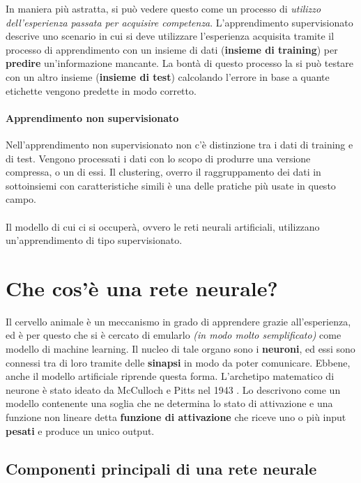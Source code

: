 \documentclass[12pt, twoside, letterpaper]{report}
\begin{document}
					In maniera più astratta, si può vedere questo come un processo di \textit{utilizzo dell'esperienza passata per acquisire competenza}. L'apprendimento supervisionato descrive uno scenario in cui si deve utilizzare l'esperienza acquisita tramite il processo di apprendimento con un insieme di dati (\textbf{insieme di training}) per \textbf{predire} un'informazione mancante. La bontà di questo processo la si può testare con un altro insieme (\textbf{insieme di test}) calcolando l'errore in base a quante etichette vengono predette in modo corretto. 
				
				\paragraph{Apprendimento non supervisionato}  Nell'apprendimento non supervisionato non c'è distinzione tra i dati di training e di test. Vengono processati i dati con lo scopo di produrre una versione compressa, o un  di essi. Il clustering, overro il raggruppamento dei dati in sottoinsiemi con caratteristiche simili è una delle pratiche più usate in questo campo.\\\\
				Il modello di cui ci si occuperà, ovvero le reti neurali artificiali, utilizzano un'apprendimento di tipo supervisionato.
				
				
		\section{Che cos'è una rete neurale?}
			Il cervello animale è un meccanismo in grado di apprendere grazie all'esperienza, ed è per questo che si è cercato di emularlo \textit{(in modo molto semplificato)} come modello di machine learning. Il nucleo di tale organo sono i \textbf{neuroni}, ed essi sono connessi tra di loro tramite delle \textbf{sinapsi} in modo da poter comunicare. Ebbene, anche il modello artificiale riprende questa forma. L'archetipo matematico di neurone è stato ideato da McCulloch e Pitts nel 1943 \cite{mcculloch_pitts}. Lo descrivono come un modello contenente una soglia che ne determina lo stato di attivazione e una funzione non lineare detta \textbf{funzione di attivazione} che riceve uno o più input \textbf{pesati} e produce un unico output.
			
		\subsection{Componenti principali di una rete neurale} 
\end{document}

